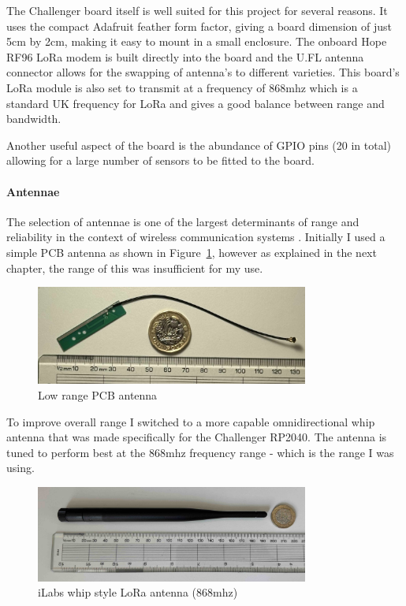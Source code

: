 The Challenger board itself is well suited for this project for several reasons.
It uses the compact Adafruit feather form factor, giving a board dimension of
just 5cm by 2cm, making it easy to mount in a small enclosure. The onboard Hope
RF96 LoRa modem is built directly into the board and the U.FL antenna connector
allows for the swapping of antenna's to different varieties. This board's LoRa
module is also set to transmit at a frequency of 868mhz which is a standard UK
frequency for LoRa and gives a good balance between range and bandwidth.

Another useful aspect of the board is the abundance of GPIO pins (20 in total)
allowing for a large number of sensors to be fitted to the board.

\paragraph{Antennae}

The selection of antennae is one of the largest determinants of range and
reliability in the context of wireless communication systems \cite{khan2016}.
Initially I used a simple PCB antenna as shown in Figure~\ref{fig:pcb-antenna},
however as explained in the next chapter, the range of this was insufficient for
my use.

\begin{figure}[H]
    \centering
    \includegraphics[width=0.8\textwidth]{contents/part-2/fig2/basic-antenna.jpg}
    \caption{Low range PCB antenna}
    \label{fig:pcb-antenna}
\end{figure}

To improve overall range I switched to a more capable omnidirectional whip
antenna that was made specifically for the Challenger RP2040. The antenna is
tuned to perform best at the 868mhz frequency range - which is the range I was
using.

\begin{figure}[H]
    \centering
    \includegraphics[width=0.8\textwidth]{contents/part-2/fig2/good-antenna.jpg}
    \caption{iLabs whip style LoRa antenna (868mhz)}
    \label{fig:good-antenna}
\end{figure}

